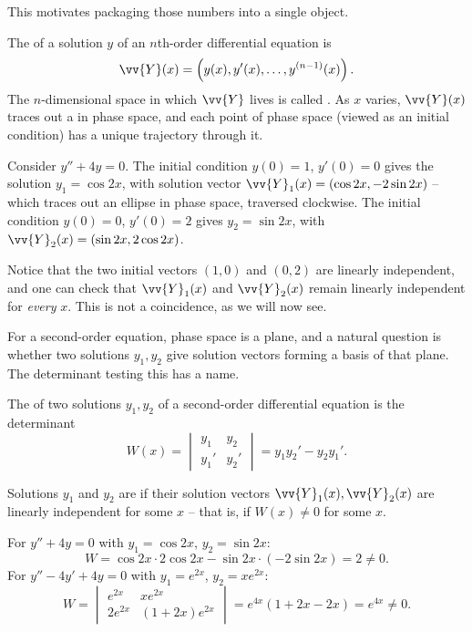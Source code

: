 This motivates packaging those numbers into a single object.

\begin{definition}
	The  of a solution $y$ of an $n$th-order differential equation is
	$$
	\vv{Y}(x) = \left(y(x), y'(x), \dots, y^{(n - 1)}(x)\right).
	$$
	The $n$-dimensional space in which $\vv{Y}$ lives is called . As $x$ varies, $\vv{Y}(x)$ traces out a  in phase space, and each point of phase space (viewed as an initial condition) has a unique trajectory through it.
\end{definition}

\begin{example}
	Consider $y'' + 4y = 0$. The initial condition $y(0) = 1$, $y'(0) = 0$ gives the solution $y_1 = \cos 2x$, with solution vector $\vv{Y}_1(x) = (\cos 2x, -2\sin 2x)$ -- which traces out an ellipse in phase space, traversed clockwise. The initial condition $y(0) = 0$, $y'(0) = 2$ gives $y_2 = \sin 2x$, with $\vv{Y}_2(x) = (\sin 2x, 2\cos 2x)$.

	Notice that the two initial vectors $(1, 0)$ and $(0, 2)$ are linearly independent, and one can check that $\vv{Y}_1(x)$ and $\vv{Y}_2(x)$ remain linearly independent for \emph{every} $x$. This is not a coincidence, as we will now see.
\end{example}

For a second-order equation, phase space is a plane, and a natural question is whether two solutions $y_1, y_2$ give solution vectors forming a basis of that plane. The determinant testing this has a name.

\begin{definition}[Wronskian]
	The  of two solutions $y_1, y_2$ of a second-order differential equation is the determinant
	$$
	W(x) = \begin{vmatrix} y_1 & y_2 \\ y_1' & y_2' \end{vmatrix} = y_1 y_2' - y_2 y_1'.
	$$
\end{definition}

\begin{definition}
	Solutions $y_1$ and $y_2$ are  if their solution vectors $\vv{Y}_1(x), \vv{Y}_2(x)$ are linearly independent for some $x$ -- that is, if $W(x) \neq 0$ for some $x$.
\end{definition}

\begin{example}
	For $y'' + 4y = 0$ with $y_1 = \cos 2x$, $y_2 = \sin 2x$:
	$$
	W = \cos 2x \cdot 2 \cos 2x - \sin 2x \cdot (-2 \sin 2x) = 2 \neq 0.
	$$
	For $y'' - 4y' + 4y = 0$ with $y_1 = e^{2x}$, $y_2 = x e^{2x}$:
	$$
	W = \begin{vmatrix} e^{2x} & x e^{2x} \\ 2e^{2x} & (1 + 2x) e^{2x}\end{vmatrix} = e^{4x}(1 + 2x - 2x) = e^{4x} \neq 0.
	$$
\end{example}

